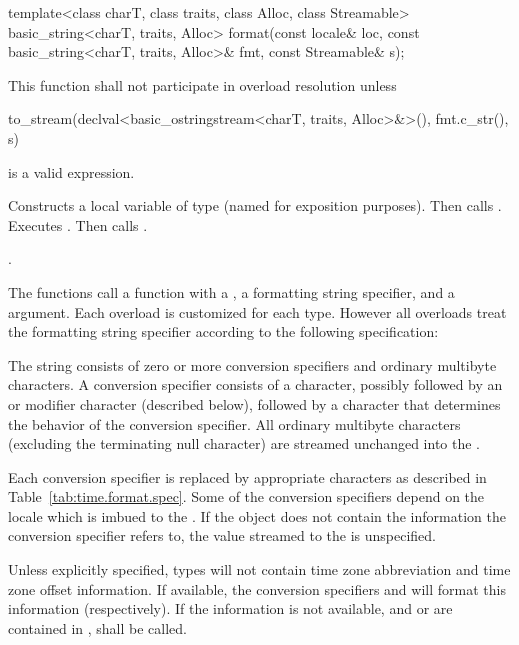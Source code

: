 \begin{itemdecl}
template<class charT, class traits, class Alloc, class Streamable>
  basic_string<charT, traits, Alloc>
    format(const locale& loc, const basic_string<charT, traits, Alloc>& fmt, const Streamable& s);
\end{itemdecl}

\begin{itemdescr}
\pnum
\remarks
This function shall not participate in overload resolution unless
\begin{codeblock}
to_stream(declval<basic_ostringstream<charT, traits, Alloc>&>(), fmt.c_str(), s)
\end{codeblock}
is a valid expression.

\pnum
\effects
Constructs a local variable of type
(named  for exposition purposes).
Then calls .
Executes .
Then calls .

\pnum
\returns {}.
\end{itemdescr}

\pnum
The  functions call a  function with
a ,
a formatting string specifier,
and a  argument.
Each  overload is customized for each  type.
However all  overloads
treat the formatting string specifier
according to the following specification:

\pnum
The  string consists of zero or more conversion specifiers
and ordinary multibyte characters.
A conversion specifier consists of
a \tcode{\%} character,
possibly followed by an  or  modifier character (described below),
followed by a character that determines the behavior of the conversion specifier.
All ordinary multibyte characters (excluding the terminating null character)
are streamed unchanged into the .

\pnum
Each conversion specifier is replaced by appropriate characters
as described in Table~\ref{tab:time.format.spec}.
Some of the conversion specifiers
depend on the locale which is imbued to the .
If the  object does not contain
the information the conversion specifier refers to,
the value streamed to the  is unspecified.

\pnum
Unless explicitly specified,
 types will not contain time zone abbreviation
and time zone offset information.
If available,
the conversion specifiers  and 
will format this information (respectively).
If the information is not available,
and  or  are contained in ,
 shall be called.

